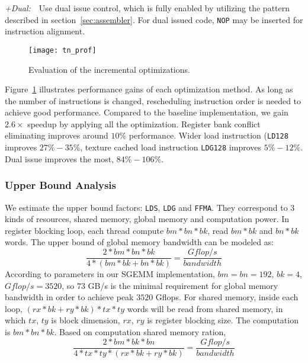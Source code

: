 {\it +Dual:}~~Use dual issue control, which is fully enabled by utilizing the pattern described in section~\ref{sec:assembler}.
For dual issued code, {\tt NOP} may be inserted for instruction alignment.

\begin{figure}[htbp]
\begin{center}
\texttt{[image: tn\_prof]}
    \caption{Evaluation of the incremental optimizations.}
\label{fig:th_prof}
\end{center}
\end{figure}

Figure~\ref{fig:th_prof} illustrates performance gains of each optimization method.
As long as the number of instructions is changed, rescheduling instruction order is needed to achieve good performance.
Compared to the baseline implementation, we gain $2.6\times$ speedup by applying all the optimization.
Register bank conflict eliminating improves around $10\%$ performance. 
Wider load instruction ({\tt LD128} improves $27\%-35\%$, texture cached
load instruction {\tt LDG128} improves $5\%-12\%$.
Dual issue improves the most, $84\%-106\%$.

\subsubsection{Upper Bound Analysis}


We estimate the upper bound factors: {\tt LDS}, {\tt LDG} and {\tt FFMA}. They correspond to $3$ kinds of resources, 
shared
memory, global memory and computation power. In register blocking loop, each thread compute $bm*bn*bk$, read $bm*bk$
and $bn*bk$ words. The upper bound of global memory bandwidth can be modeled as:
\begin{displaymath}
    \frac{2*bm*bn*bk}{4*(bm*bk + bn*bk)} = \frac{Gflop/s}{bandwidth}
\end{displaymath}
According to parameters in our SGEMM implementation, $bm=bn=192$, $bk=4$, $Gflop/s=3520$, so $73$ GB/s is the minimal
requirement for global memory bandwidth in order to achieve peak $3520$ Gflops.
For shared memory, inside each loop, $(rx*bk + ry * bk)*tx*ty$ words will be read from shared memory, in which $tx$,
$ty$ is block dimension, $rx$, $ry$ is register blocking size. The computation is $bm*bn*bk$. Based on computation
shared memory ration,
\begin{displaymath}
    \frac{2*bm*bk*bn}{4*tx*ty*(rx*bk + ry *bk)}  = \frac{Gflop/s}{bandwidth}
\end{displaymath}

